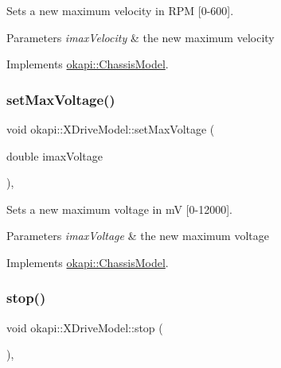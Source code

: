 Sets a new maximum velocity in R\+PM \mbox{[}0-\/600\mbox{]}.


\begin{DoxyParams}{Parameters}
{\em imax\+Velocity} & the new maximum velocity \\
\hline
\end{DoxyParams}


Implements \mbox{\hyperlink{classokapi_1_1ChassisModel_ae7fcb4cc95fdd7fd3c8f8388b4a698b2}{okapi\+::\+Chassis\+Model}}.

\mbox{\label{classokapi_1_1XDriveModel_a6d001a2147ecb642f60cd21ac73c64ea}} 
\subsubsection{\texorpdfstring{setMaxVoltage()}{setMaxVoltage()}}
{\footnotesize\ttfamily void okapi\+::\+X\+Drive\+Model\+::set\+Max\+Voltage (\begin{DoxyParamCaption}\item[{double}]{imax\+Voltage }\end{DoxyParamCaption})\hspace{0.3cm}{\ttfamily [override]}, {\ttfamily [virtual]}}

Sets a new maximum voltage in mV \mbox{[}0-\/12000\mbox{]}.


\begin{DoxyParams}{Parameters}
{\em imax\+Voltage} & the new maximum voltage \\
\hline
\end{DoxyParams}


Implements \mbox{\hyperlink{classokapi_1_1ChassisModel_a2fb261636b79e118f22530cc3fce4f41}{okapi\+::\+Chassis\+Model}}.

\mbox{\label{classokapi_1_1XDriveModel_a2fe09b755e8a6f321d6365cedc774e04}} 
\subsubsection{\texorpdfstring{stop()}{stop()}}
{\footnotesize\ttfamily void okapi\+::\+X\+Drive\+Model\+::stop (\begin{DoxyParamCaption}{ }\end{DoxyParamCaption})\hspace{0.3cm}{\ttfamily [override]}, {\ttfamily [virtual]}}

